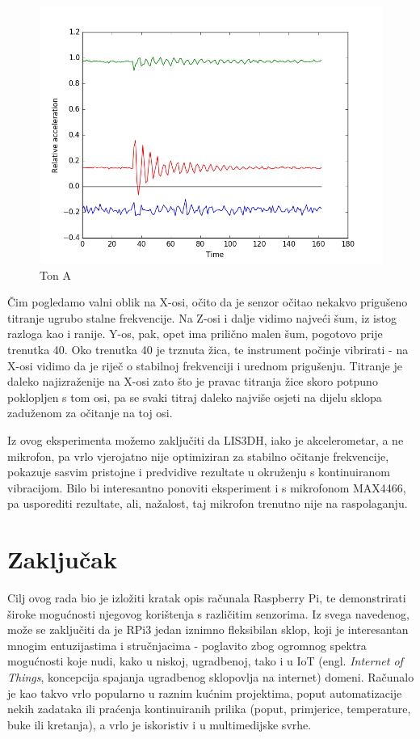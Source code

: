 \documentclass[12pt,a4paper]{article}
\begin{document}
	\begin{figure}[h!]
	  \includegraphics[width=\linewidth]{slike/bass3.png}
	  \caption{Ton A}
	  \label{fig:bass3}
	\end{figure}

	Čim pogledamo valni oblik na X-osi, očito da je senzor očitao nekakvo prigušeno titranje ugrubo stalne frekvencije. Na Z-osi i dalje vidimo najveći šum, iz istog razloga kao i ranije. Y-os, pak, opet ima prilično malen šum, pogotovo prije trenutka 40. Oko trenutka 40 je trznuta žica, te instrument počinje vibrirati - na X-osi vidimo da je riječ o stabilnoj frekvenciji i urednom prigušenju. Titranje je daleko najizraženije na X-osi zato što je pravac titranja žice skoro potpuno poklopljen s tom osi, pa se svaki titraj daleko najviše osjeti na dijelu sklopa zaduženom za očitanje na toj osi.
	\par Iz ovog eksperimenta možemo zaključiti da LIS3DH, iako je akcelerometar, a ne mikrofon, pa vrlo vjerojatno nije optimiziran za stabilno očitanje frekvencije, pokazuje sasvim pristojne i predvidive rezultate u okruženju s kontinuiranom vibracijom. Bilo bi interesantno ponoviti eksperiment i s mikrofonom MAX4466, pa usporediti rezultate, ali, nažalost, taj mikrofon trenutno nije na raspolaganju.



\newpage
\section{Zaključak}
	Cilj ovog rada bio je izložiti kratak opis računala Raspberry Pi, te demonstrirati široke mogućnosti njegovog korištenja s različitim senzorima. Iz svega navedenog, može se zaključiti da je RPi3 jedan iznimno fleksibilan sklop, koji je interesantan mnogim entuzijastima i stručnjacima - poglavito zbog ogromnog spektra mogućnosti koje nudi, kako u niskoj, ugradbenoj, tako i u IoT (engl. \textit{Internet of Things}, koncepcija spajanja ugradbenog sklopovlja na internet) domeni. Računalo je kao takvo vrlo popularno u raznim kućnim projektima, poput automatizacije nekih zadataka ili praćenja kontinuiranih prilika (poput, primjerice, temperature, buke ili kretanja), a vrlo je iskoristiv i u multimedijske svrhe. \\
\end{document}
